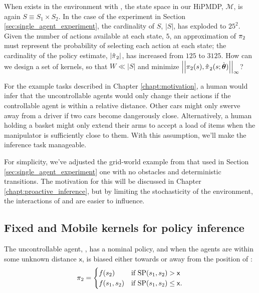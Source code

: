 	When  exists in the environment with , the state space in our \ac{HiPMDP}, $\mathcal{M}$, is again $S \equiv S_1 \times S_2$. In the case of the experiment in Section \ref{sec:single_agent_experiment}, the cardinality of $S$, $|S|$, has exploded to $25^2$. Given the number of actions available at each state, $5$, an approximation of $\pi_{2}$ must represent the probability of selecting each action at each state; the cardinality of the policy estimate, $|\hat{\pi_{}}_2|$, has increased from $125$ to $3125$. How can we design a set of kernels, so that $W \ll |S|$ and minimize $\left|\left|\pi_{2}(s), \hat{\pi_{}}_2(s;\hat{\boldsymbol{\mathbb{\theta}}})\right|\right|_{\infty}$?
	
	
For the example tasks described in Chapter \ref{chapt:motivation}, a human would infer that the uncontrollable
agents would only change their actions if the controllable agent is within a relative distance. Other cars might
only swerve away from a driver if two cars become dangerously close. Alternatively, a human holding a basket might
only extend their arms to accept a load of items when the manipulator is sufficiently close to them. With this assumption, we'll make the inference task manageable.

For simplicity, we've adjusted the grid-world example from that used in Section \ref{sec:single_agent_experiment} one with no obstacles and deterministic transitions. The motivation for this will be discussed in Chapter \ref{chapt:proactive_inference}, but by limiting the stochasticity of the environment, the interactions of  and  are easier to influence.

\subsection{Fixed and Mobile kernels for policy inference}\label{sec:fixed_and_mobile_kernels}

\begin{assumption}\label{assump:multi_agent_interraction}
	The uncontrollable agent, , has a nominal policy, and when the agents are within some unknown distance
	$\mathsf{x}$,  is biased either towards or away from the position of :
	\begin{align*}
	\pi_{2} & = \begin{cases}
	f(s_2) & \text{if}\ \textnormal{SP}(s_1,s_2) > \mathsf{x} \\
	f(s_1,s_2) & \text{if}\ \textnormal{SP}(s_1,s_2) \leq \mathsf{x}.
	\end{cases} \\
	\end{align*}
\end{assumption}

